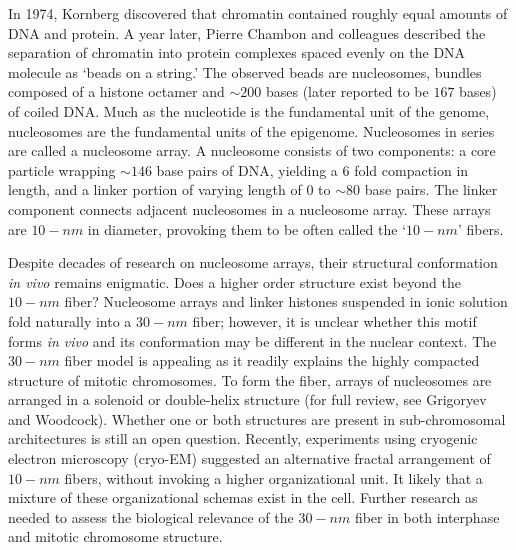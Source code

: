 In 1974, Kornberg discovered that chromatin contained roughly equal amounts of \gls{DNA} and protein\cite{kornberg1974}.  A year later, Pierre Chambon
and colleagues described the separation of chromatin into protein complexes spaced evenly on the \gls{DNA} molecule as `beads on a string.'\cite{oudet1975}
The observed beads are nucleosomes, bundles composed of a histone octamer and $\sim200$ bases (later reported to be $167$ bases)\cite{robinson2006} of
coiled \gls{DNA}. Much as the nucleotide is the fundamental unit of the genome, nucleosomes are the fundamental units of the epigenome.  Nucleosomes in
series are called a \gls{nucleosome array}.  A nucleosome consists of two components: a core particle wrapping $\sim146$ base pairs of DNA, yielding a
6 fold compaction in length, and a linker portion of varying length of $0$ to $\sim80$ base pairs.  The linker component connects adjacent nucleosomes
in a nucleosome array\cite{wu2007}\cite{hansen2012}.  These arrays are $10-nm$ in diameter, provoking them to be often called the `$10-nm$' fibers.

Despite decades of research on nucleosome arrays, their structural conformation \textit{\gls{in vivo}} remains enigmatic.   Does a higher order structure
exist beyond the $10-nm$ fiber?  Nucleosome arrays and linker histones suspended in ionic solution fold naturally into a $30-nm$ fiber\cite{tremethick2007};
however, it is unclear whether this motif forms \textit{\gls{in vivo}} and its conformation may be different in the nuclear context\cite{bian2012}.
The $30-nm$ fiber model is appealing as it readily explains the highly compacted structure of mitotic chromosomes.  To form the fiber, arrays of nucleosomes
are arranged in a solenoid or double-helix structure (for full review, see Grigoryev and Woodcock\cite{grigoryev2012}).  Whether one or both structures
are present in sub-chromosomal architectures is still an open question\cite{song2014}.  Recently, experiments using cryogenic electron microscopy
(cryo-EM) suggested an alternative fractal arrangement of $10-nm$ fibers, without invoking a higher organizational unit\cite{nishino2012}\cite{hansen2012}.
It likely that a mixture of these organizational schemas exist in the cell.  Further research as needed to assess the biological relevance of the $30-nm$ fiber in
both interphase and mitotic chromosome structure.

